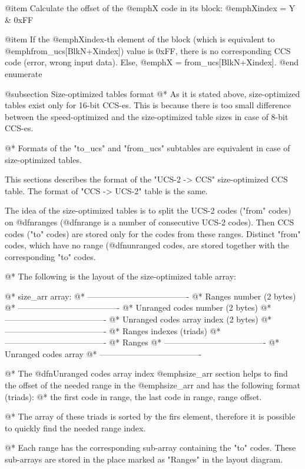 @item Calculate the offset of the @emph{X} code in its block: 
@emph{Xindex = Y & 0xFF}

@item If the @emph{Xindex}-th element of the block (which is equivalent to
@emph{from_ucs[BlkN+Xindex]}) value is 0xFF, there is no corresponding
CCS code (error, wrong input data). Else, @emph{X = from_ucs[BlkN+Xindex]}.
@end enumerate

@subsection Size-optimized tables format
@*
As it is stated above, size-optimized tables exist only for 16-bit CCS-es.
This is because there is too small difference between the speed-optimized
and the size-optimized table sizes in case of 8-bit CCS-es.

@*
Formats of the "to_ucs" and "from_ucs" subtables are equivalent in case of
size-optimized tables.

This sections describes the format of the "UCS-2 -> CCS" size-optimized
CCS table. The format of "CCS -> UCS-2" table is the same.

The idea of the size-optimized tables is to split the UCS-2 codes
("from" codes) on @dfn{ranges} (@dfn{range} is a number of consecutive UCS-2 codes).
Then CCS codes ("to" codes) are stored only for the codes from these
ranges. Distinct "from" codes, which have no range (@dfn{unranged codes}, are stored
together with the corresponding "to" codes.

@*
The following is the layout of the size-optimized table array:

@*
size_arr array:
@*
-------------------------------------
@*
Ranges number (2 bytes)
@*
-------------------------------------
@*
Unranged codes number (2 bytes)
@*
-------------------------------------
@*
Unranged codes array index (2 bytes)
@*
-------------------------------------
@*
Ranges indexes (triads)
@*
-------------------------------------
@*
Ranges
@*
-------------------------------------
@*
Unranged codes array
@*
-------------------------------------

@*
The @dfn{Unranged codes array index} @emph{size_arr} section helps to find
the offset of the needed range in the @emph{size_arr} and has
the following format (triads):
@*
the first code in range, the last code in range, range offset.

@*
The array of these triads is sorted by the firs element, therefore it is
possible to quickly find the needed range index.

@*
Each range has the corresponding sub-array containing the "to" codes. These
sub-arrays are stored in the place marked as "Ranges" in the layout
diagram. 

